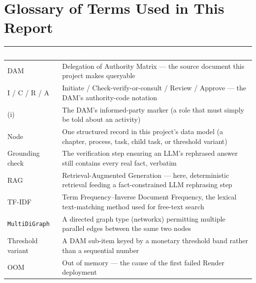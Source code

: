 \chapter{Glossary of Terms Used in This Report}
\label{ch:glossary-of-terms-used-in-this-report}
\begin{longtable}{|p{}|p{}|}
\hline
\rowcolor{thesisgreen}\textcolor{white}{\textbf{Term}} & \textcolor{white}{\textbf{Meaning}} \\
\hline\endhead
DAM & Delegation of Authority Matrix — the source document this project makes queryable \\
\hline
I / C / R / A & Initiate / Check-verify-or-consult / Review / Approve — the DAM's authority-code notation \\
\hline
(i) & The DAM's informed-party marker (a role that must simply be told about an activity) \\
\hline
Node & One structured record in this project's data model (a chapter, process, task, child task, or threshold variant) \\
\hline
Grounding check & The verification step ensuring an LLM's rephrased answer still contains every real fact, verbatim \\
\hline
RAG & Retrieval-Augmented Generation — here, deterministic retrieval feeding a fact-constrained LLM rephrasing step \\
\hline
TF-IDF & Term Frequency–Inverse Document Frequency, the lexical text-matching method used for free-text search \\
\hline
\texttt{MultiDiGraph} & A directed graph type (networkx) permitting multiple parallel edges between the same two nodes \\
\hline
Threshold variant & A DAM sub-item keyed by a monetary threshold band rather than a sequential number \\
\hline
OOM & Out of memory — the cause of the first failed Render deployment \\
\hline
\end{longtable}
